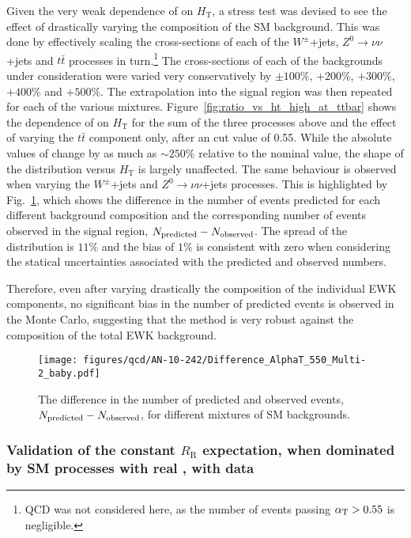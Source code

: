 Given the very weak dependence of \RaT on $H_{\mathrm{T}}$, a stress
test was devised to see the effect of drastically varying the
composition of the SM background. This was done by effectively scaling
the cross-sections of each of the $W^{\pm}$+jets,
$Z^{0}\rightarrow\nu\nu$+jets and $t\bar{t}$ processes in
turn.\footnote{QCD was not considered here, as the number of events
  passing $\alpha_{\mathrm{T}} > 0.55$ is negligible.} The cross-sections of each of
the backgrounds under consideration were varied very conservatively by
$\pm100\%$, $+200\%$, $+300\%$, $+400\%$ and $+500\%$. The
extrapolation into the signal region was then repeated for each of the
various mixtures. Figure~\ref{fig:ratio_vs_ht_high_at_ttbar} shows the
dependence of \RaT on $H_{\mathrm{T}}$ for the sum of the three
processes above and the effect of varying the $t\bar{t}$ component
only, after an \aT cut value of 0.55. While the absolute values of
\RaT change by as much as $\sim250\%$ relative to the nominal value,
the shape of the \RaT distribution versus $H_{\mathrm{T}}$ is largely
unaffected. The same behaviour is observed when varying the
$W^{\pm}$+jets and $Z^{0}\rightarrow\nu\nu$+jets processes. This is
highlighted by Fig.~\ref{fig:prediction_diff}, which shows the
difference in the number of events predicted for each different
background composition and the corresponding number of events observed
in the signal region, $N_{\mathrm{predicted}} - N_{\mathrm{observed}}$. The spread of the distribution
is $11\%$ and the bias of $1\%$ is consistent with zero when
considering the statical uncertainties associated with the predicted
and observed numbers.

Therefore, even after varying drastically the composition of the
individual EWK components, no significant bias in the number of
predicted events is observed in the Monte Carlo, suggesting that the
method is very robust against the composition of the total EWK
background.

\begin{figure}[!t]
  \begin{center}
    \texttt{[image: figures/qcd/AN-10-242/Difference\_AlphaT\_550\_Multi-2\_baby.pdf]}
    \caption{\label{fig:prediction_diff} The difference in the number
      of predicted and observed events, $N_{\mathrm{predicted}} - N_{\mathrm{observed}}$, for different
      mixtures of SM backgrounds. }
  \end{center} 
\end{figure}



\subsubsection{Validation of the constant $R_{\mathrm{R}}$
  expectation, when dominated by SM processes with real \mymet, with
  data}

